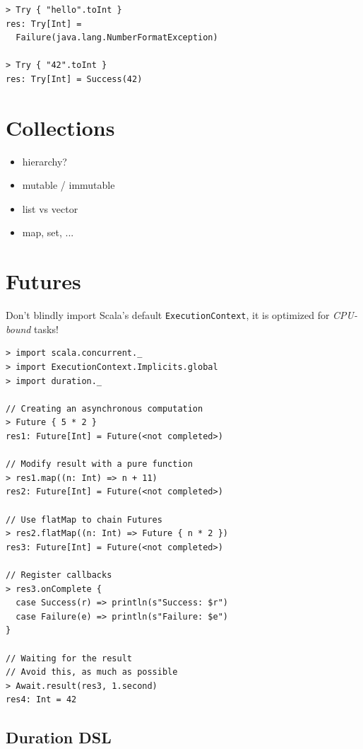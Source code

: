 \documentclass[10pt,landscape,a4paper]{article}
\newcommand{\TODO}[2][]{\todo[inline,color=green!40,linecolor=green!50,#1]{\small TODO #2}}
\begin{document}
\begin{multicols*}{4}
\begin{verbatim}
> Try { "hello".toInt }
res: Try[Int] =
  Failure(java.lang.NumberFormatException)

> Try { "42".toInt }
res: Try[Int] = Success(42)
\end{verbatim}

  \section{Collections}
  \TODO{}

  \begin{itemize}
  \item hierarchy?
  \item mutable / immutable
  \item list vs vector
  \item map, set, ...
  \end{itemize}

  \section{Futures}

  \begin{mdframed}
    \footnotesize
    Don't blindly import Scala's default \texttt{ExecutionContext}, it
    is optimized for \textit{CPU-bound} tasks!
  \end{mdframed}

\begin{verbatim}
> import scala.concurrent._
> import ExecutionContext.Implicits.global
> import duration._

// Creating an asynchronous computation
> Future { 5 * 2 }
res1: Future[Int] = Future(<not completed>)

// Modify result with a pure function
> res1.map((n: Int) => n + 11)
res2: Future[Int] = Future(<not completed>)

// Use flatMap to chain Futures
> res2.flatMap((n: Int) => Future { n * 2 })
res3: Future[Int] = Future(<not completed>)

// Register callbacks
> res3.onComplete {
  case Success(r) => println(s"Success: $r")
  case Failure(e) => println(s"Failure: $e")
}

// Waiting for the result
// Avoid this, as much as possible
> Await.result(res3, 1.second)
res4: Int = 42
\end{verbatim}
  \subsection{Duration DSL}


\end{multicols*}
\end{document}
